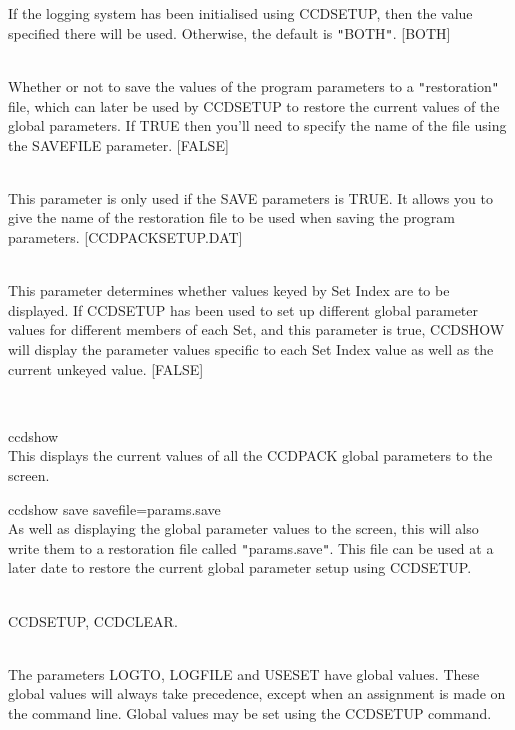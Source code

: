 \documentclass[twoside,11pt]{article}
\newcommand{\htmlref}[2]{#1}
\renewcommand{\_}{\texttt{\symbol{95}}}
\newcommand{\qt}[1]{{\tt "}#1{\tt "}}
\newcommand{\routine}[1]{{\sc #1}}
\newcommand{\xroutine}[1]{\htmlref{{\sc #1}}{#1}}
\newcommand{\sstexamples}[1]{
   \item[Examples:] \mbox{} \\
   \vspace{-3.5ex}
   \begin{description}
      #1
   \end{description}
}
\newcommand{\sstsubsection}[1]{ \item[{#1}] \mbox{} \\}
\newcommand{\sstexamplesubsection}[2]{\sloppy \item{\ssttt #1} \mbox{} \\ #2 }
\newcommand{\sstdiytopic}[2]{\item[#1:] \mbox{} \\[1.3ex] #2}
\newcommand{\sstexamples}[1]{
      \item[Examples:] \\
      \begin{description}
         #1
      \end{description}
      \\
   }
\newcommand{\sstsubsection}[1]{\item[{#1}]}
\newcommand{\sstexamplesubsection}[2]{\item[{\ssttt #1}] #2}
\newcommand{\sstdiytopic}[2]{\item[{#1:}] #2 }
\begin{document}
{{{{         }
         If the logging system has been initialised using \xroutine{CCDSETUP},
         then the value specified there will be used. Otherwise, the
         default is \qt{BOTH}.
         [BOTH]
      }
      \sstsubsection{
         SAVE = \_LOGICAL (Read)
      } {
         Whether or not to save the values of the program parameters to a
         \qt{restoration} file, which can later be used by \xroutine{CCDSETUP}
         to restore the current values of the global parameters.
         If TRUE then you'll need to specify the name of the file using
         the SAVEFILE parameter.
         [FALSE]
      }
      \sstsubsection{
         SAVEFILE = FILENAME (Read)
      } {
         This parameter is only used if the SAVE parameters is TRUE.
         It allows you to give the name of the restoration file to be used
         when saving the program parameters.
         [CCDPACK\_SETUP.DAT]
      }
      \sstsubsection{
         USESET = \_LOGICAL (Read)
      } {
         This parameter determines whether values keyed by Set Index
         are to be displayed.  If \xroutine{CCDSETUP} has been used to set up
         different global parameter values for different members of
         each Set, and this parameter is true, \routine{CCDSHOW} will display
         the parameter values specific to each Set Index value
         as well as the current unkeyed value.
         [FALSE]
      }
   }
   \sstexamples{
      \sstexamplesubsection{
         ccdshow
      } {
         This displays the current values of all the CCDPACK global
         parameters to the screen.
      }
      \sstexamplesubsection{
         ccdshow save savefile=params.save
      } {
         As well as displaying the global parameter values to the
         screen, this will also write them to a restoration file
         called \qt{params.save}.  This file can be used at a later date
         to restore the current global parameter setup using 
         \xroutine{CCDSETUP}.
      }
   }
   \sstdiytopic{
      See also
   } {
      \xroutine{CCDSETUP}, \xroutine{CCDCLEAR}.
   }
   \sstdiytopic{
      Behaviour of parameters
   } {
      The parameters LOGTO, LOGFILE and USESET have global values. These
      global values will always take precedence, except when an
      assignment is made on the command line.  Global values may be set
      using the \routine{CCDSETUP} command.
   }
}
\end{document}
